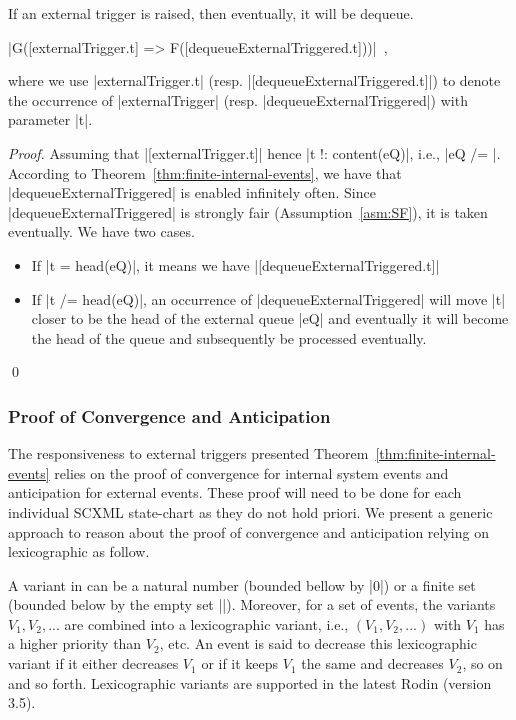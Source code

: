 \begin{theorem}
  \label{thm:resp-ext-trg}
  If an external trigger is raised, then eventually, it will be dequeue.
  \begin{center}
    |G([externalTrigger.t] => F([dequeueExternalTriggered.t]))|~,
  \end{center}
  where we use |externalTrigger.t|
  (resp. |[dequeueExternalTriggered.t]|) to denote the occurrence of
  |externalTrigger| (resp. |dequeueExternalTriggered|) with parameter |t|.
\end{theorem}
\begin{proof}
  Assuming that |[externalTrigger.t]| hence |t !: content(eQ)|, i.e.,
  |eQ /= {}|.  According to Theorem~\ref{thm:finite-internal-events},
  we have that |dequeueExternalTriggered| is enabled infinitely often.
  Since |dequeueExternalTriggered| is strongly fair
  (Assumption~\ref{asm:SF}), it is taken eventually. We have two
  cases.
  \begin{itemize}
  \item If |t = head(eQ)|, it means we have
    |[dequeueExternalTriggered.t]|
    
  \item If |t /= head(eQ)|, an occurrence of |dequeueExternalTriggered|
    will move |t| closer to be the head of the external queue |eQ| and
    eventually it will become the head of the queue and subsequently
    be processed eventually.
  \end{itemize}
  \qed
\end{proof}

\subsubsection{Proof of Convergence and Anticipation}
\label{sec:proof-convergence}
The responsiveness to external triggers presented
Theorem~\ref{thm:finite-internal-events} relies on the proof of
convergence for internal system events and anticipation for external
events. These proof will need to be done for each individual SCXML
state-chart as they do not hold priori.  We present a generic approach
to reason about the proof of convergence and anticipation relying on
lexicographic as follow.

A variant in \EventB can be a natural number (bounded bellow by |0|)
or a finite set (bounded below by the empty set |{}|).  Moreover, for
a set of events, the variants $V_1, V_2, ...$ are combined into a
lexicographic variant, i.e., $(V_1, V_2, ...)$ with $V_1$ has a higher
priority than $V_2$, etc. An event is said to decrease this
lexicographic variant if it either decreases $V_1$ or if it keeps
$V_1$ the same and decreases $V_2$, so on and so forth.  Lexicographic
variants are supported in the latest Rodin (version 3.5).

